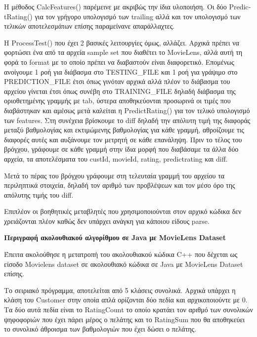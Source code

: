 \documentclass{report}
\begin{document}
Η μέθοδος \textlatin{CalcFeatures}() παρέμεινε με ακριβώς την ίδια υλοποιήση. Οι δύο \textlatin{PredictRating}()  για τον γρήγορο υπολογισμό των \textlatin{trailing} αλλά και τον υπολογισμό των τελικών αποτελεσμάτων επίσης παραμείνανε απαράλλαχτες.

Η \textlatin{ProcessTest}() που έχει 2 βασικές λειτουργίες όμως, αλλάζει. Αρχικά πρέπει να φορτώσει ένα από τα αρχεία \textlatin{sample set} που διαθέτει το \textlatin{MovieLens}, αλλά αυτή τη φορά το \textlatin{format} με το οποίο πρέπει να διαβαστούν είναι διαφορετικό. Επομένως ανοίγουμε 1 ροή για διάβασμα στο \textlatin{TESTING\_FILE} και 1 ροή για γράψιμο στο \textlatin{PREDICTION\_FILE} έτσι όπως γινόταν αρχικά αλλά πλέον το διάβασμα του αρχείου γίνεται έτσι όπως συνέβη στο \textlatin{TRAINING\_FILE} δηλαδή διάβασμα της οριοθετημένης γραμμής με \textlatin{tab}, ύστερα αποθηκεύονται προσωρινά οι τιμές που διαβάστηκαν και αμέσως μετά καλείται η \textlatin{PredictRating}() για τον τελικό υπολογισμό των \textlatin{features}. Στη συνέχεια βρίσκουμε το \textlatin{diff} δηλαδή την απόλυτη τιμή της διαφοράς μεταξύ βαθμολογίας και εκτιμώμενης βαθμολογίας για κάθε γραμμή, αθροίζουμε τις διαφορές αυτές και αυξάνουμε τον μετρητή σε κάθε επανάληψη. Πριν το τέλος του βρόγχου, γράφουμε σε κάθε γραμμή στην ίδια μορφή που διαβάσαμε τα άλλα δύο αρχεία, τα αποτελέσματα του \textlatin{custId, movieId, rating, predictrating και diff}.

Μετά το πέρας του βρόγχου γράφουμε στη τελευταία γραμμή του αρχείου τα περιληπτικά στοιχεία, δηλαδή τον αριθμό των προβλέψεων και τον μέσο όρο της απόλυτης τιμής του \textlatin{diff}.

Επιπλέον οι βοηθητικές μεταβλητές που χρησιμοποιούνται στον αρχικό κώδικα δεν χρειάζονται πλέον καθώς δεν υπάρχει ανάγκη για κάποιου είδους \textlatin{parse}.

\vspace{4mm} 

\textbf{Περιγραφή ακολουθιακού αλγορίθμου σε \textlatin{Java} με \textlatin{MovieLens Dataset} }

\vspace{2mm}

Έπειτα ακολούθησε η μετατροπή του  ακολουθιακού κώδικα \textlatin{C++} που δέχεται ως είσοδο \textlatin{Movielens dataset} σε ακολουθιακό κώδικα σε \textlatin{Java} με \textlatin{MovieLens Dataset} επίσης.

Το σειριακό πρόγραμμα, αποτελείται από 5 κλάσεις συνολικά. Αρχικά υπάρχει η κλάση του \textlatin{Customer} στην οποία απλά ορίζονται δύο πεδία και αρχικοποιούντε με 0. Τα  δύο αυτά πεδία είναι το \textlatin{RatingCount} το οποίο κρατάει τον αριθμό των συνολικών ψηφοφοριών που έχει πάρει μέρος ο πελάτης και το \textlatin{RatingSum} που θα αποθηκεύει το συνολικό άθροισμα των βαθμολογιών που έχει δώσει ο πελάτης. 
\end{document}
